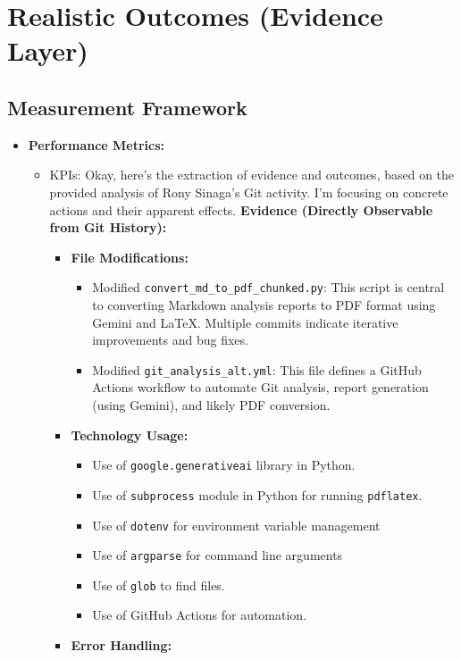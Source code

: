 \documentclass{article}
\begin{document}
\section{Realistic Outcomes (Evidence Layer)}
\subsection{Measurement Framework}
\begin{itemize}
    \item \textbf{Performance Metrics:}
    \begin{itemize}
        \item KPIs: Okay, here's the extraction of evidence and outcomes, based on the provided analysis of Rony Sinaga's Git activity.  I'm focusing on concrete actions and their apparent effects.
\textbf{Evidence (Directly Observable from Git History):}
\begin{itemize}
    \item \textbf{File Modifications:}
    \begin{itemize}
        \item Modified \texttt{convert\_md\_to\_pdf\_chunked.py}:  This script is central to converting Markdown analysis reports to PDF format using Gemini and LaTeX.  Multiple commits indicate iterative improvements and bug fixes.
        \item Modified \texttt{git\_analysis\_alt.yml}: This file defines a GitHub Actions workflow to automate Git analysis, report generation (using Gemini), and likely PDF conversion.
    \end{itemize}
    \item \textbf{Technology Usage:}
    \begin{itemize}
        \item Use of \texttt{google.generativeai} library in Python.
        \item Use of \texttt{subprocess} module in Python for running \texttt{pdflatex}.
        \item Use of \texttt{dotenv} for environment variable management
        \item Use of \texttt{argparse} for command line arguments
        \item Use of \texttt{glob} to find files.
        \item Use of GitHub Actions for automation.
    \end{itemize}
    \item \textbf{Error Handling:}
    \begin{itemize}

\end{itemize}
\end{itemize}
\end{itemize}
\end{itemize}
\end{document}
